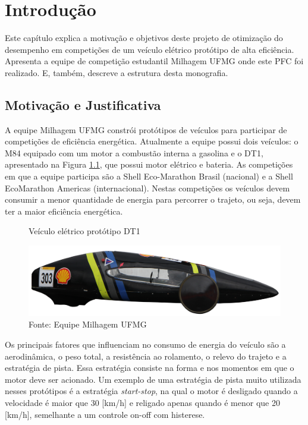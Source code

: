 \chapter{Introdução}
\label{chap:intro}
\thispagestyle{empty}

Este capítulo explica a motivação e objetivos deste projeto de otimização do desempenho em competições de um veículo elétrico protótipo de alta eficiência.
Apresenta a equipe de competição estudantil Milhagem UFMG onde este PFC foi realizado. E, também, descreve a estrutura desta monografia.

\section{Motivação e Justificativa}
\label{sec:motivacao}

A equipe Milhagem UFMG constrói protótipos de veículos para participar de competições
de eficiência energética. Atualmente a equipe possui dois veículos: o M84 equipado com um motor a combustão interna a gasolina e o DT1,
 apresentado na Figura \ref{fig:DT1}, que possui motor elétrico e bateria. As competições em que a
equipe participa são a Shell Eco-Marathon Brasil (nacional) e a Shell EcoMarathon Americas (internacional).
Nestas competições os veículos devem consumir a
menor quantidade de energia para percorrer o trajeto, ou seja, devem ter a maior eficiência
energética.

\begin{figure}[h]
    \centering
    \caption{Veículo elétrico protótipo DT1}
    \label{fig:DT1}
    \includegraphics[scale=0.11]{Introducao/Figuras/dt1.png}
    \caption*{\footnotesize{Fonte: Equipe Milhagem UFMG}}
\end{figure}

Os principais fatores que influenciam no consumo de energia do veículo são a
aerodinâmica, o peso total, a resistência ao rolamento, o relevo do trajeto e a estratégia
de pista. Essa estratégia consiste na forma e nos momentos em que o motor deve ser
acionado. Um exemplo de uma estratégia de pista muito utilizada nesses protótipos é a
estratégia \textit{start-stop}, na qual o motor é desligado quando a velocidade é maior que 30
[km/h] e religado apenas quando é menor que 20 [km/h], semelhante a um controle on-off
com histerese.

